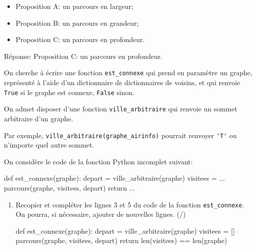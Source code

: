 \begin{enumerate}[resume=monDS]
\begin{minipage}{0.48\linewidth}
    \begin{itemize}[label=$\square$]
    \item Proposition A\@:  un parcours en largeur;
    \item Proposition B\@: un parcours en grandeur;
    \item Proposition C\@: un parcours en profondeur.
\end{itemize}
\end{minipage}\hfill{}
\begin{minipage}{0.48\linewidth}
    \begin{blocvisible}[height=1.5]
    Réponse: Proposition C\@: un parcours en profondeur.
    \end{blocvisible}
\end{minipage}



\end{enumerate}


\medskip

On cherche à écrire une fonction \texttt{est\_connexe} qui prend en paramètre un graphe, représenté à l'aide d'un dictionnaire de dictionnaires de voisins, et qui renvoie \texttt{True} si le graphe est connexe, \texttt{False} sinon.

On admet disposer d'une fonction \texttt{ville\_arbitraire} qui renvoie un sommet arbitraire d'un graphe.

Par exemple, \texttt{ville\_arbitraire(graphe\_airinfo)} pourrait renvoyer \verb|'T'| ou n'importe quel autre sommet.

On considère le code de la fonction Python incomplet suivant:

\begin{CodePythontexAlt}[TaillePolice=\large, Largeur=1\linewidth,Centre,Lignes=true,PremLigne=1]{}
def est_connexe(graphe):
    depart = ville_arbitraire(graphe)
    visitees = ...
    parcours(graphe, visitees, depart)  
    return ...
\end{CodePythontexAlt}

\begin{enumerate}[resume=monDS]
    \item Recopier et compléter les lignes 3 et 5 du code de la fonction \texttt{est\_connexe}. On pourra, si nécessaire, ajouter de nouvelles lignes. (/)

\begin{blocvisible}[height=3.5]
\begin{CodePythontexAlt}[TaillePolice=\large, Largeur=1\linewidth,Centre,Lignes=true,PremLigne=1]{}
def est_connexe(graphe):
    depart = ville_arbitraire(graphe)
    visitees = []
    parcours(graphe, visitees, depart)
    return len(visitees) == len(graphe)
\end{CodePythontexAlt}
\end{blocvisible}

\end{enumerate}
\pagebreak


